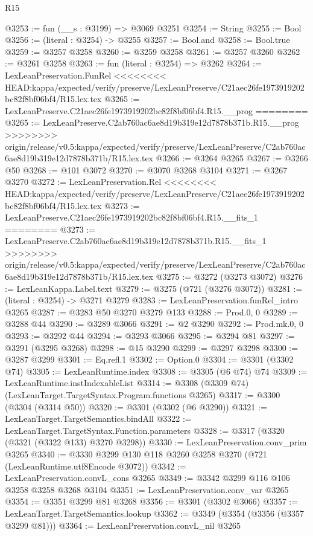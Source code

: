 \begin{lexlean}{R15}
\begin{coremodule}
{{{{{{{{{{{{{{{{{{{{{{{{{{{{{{{{{{{{{{{{{{{{{{{{{{{{{{{{{{{{{{{{{{{{{{@3253 := fun (__s : @3199) => @3069 @3251
@3254 := String
@3255 := Bool
@3256 := (literal : @3254) -> @3255
@3257 := Bool.and
@3258 := Bool.true
@3259 := @3257 @3258
@3260 := @3259 @3258
@3261 := @3257 @3260
@3262 := @3261 @3258
@3263 := fun (literal : @3254) => @3262
@3264 := LexLeanPreservation.FunRel
<<<<<<<< HEAD:kappa/expected/verify/preserve/LexLeanPreserve/C21aec26fe1973919202bc82f8bf06bf4/R15.lex.tex
@3265 := LexLeanPreserve.C21aec26fe1973919202bc82f8bf06bf4.R15.__prog
========
@3265 := LexLeanPreserve.C2ab760ac6ae8d19b319e12d7878b371b.R15.__prog
>>>>>>>> origin/release/v0.5:kappa/expected/verify/preserve/LexLeanPreserve/C2ab760ac6ae8d19b319e12d7878b371b/R15.lex.tex
@3266 := @3264 @3265
@3267 := @3266 @50
@3268 := @101 @3072
@3270 := @3070 @3268 @3104
@3271 := @3267 @3270
@3272 := LexLeanPreservation.Rel
<<<<<<<< HEAD:kappa/expected/verify/preserve/LexLeanPreserve/C21aec26fe1973919202bc82f8bf06bf4/R15.lex.tex
@3273 := LexLeanPreserve.C21aec26fe1973919202bc82f8bf06bf4.R15.__fits_1
========
@3273 := LexLeanPreserve.C2ab760ac6ae8d19b319e12d7878b371b.R15.__fits_1
>>>>>>>> origin/release/v0.5:kappa/expected/verify/preserve/LexLeanPreserve/C2ab760ac6ae8d19b319e12d7878b371b/R15.lex.tex
@3275 := @3272 (@3273 @3072)
@3276 := LexLeanKappa.Label.text
@3279 := @3275 (@721 (@3276 @3072))
@3281 := (literal : @3254) -> @3271 @3279
@3283 := LexLeanPreservation.funRel_intro @3265
@3287 := @3283 @50 @3270 @3279 @133
@3288 := Prod.{0, 0}
@3289 := @3288 @44
@3290 := @3289 @3066
@3291 := @2 @3290
@3292 := Prod.mk.{0, 0}
@3293 := @3292 @44
@3294 := @3293 @3066
@3295 := @3294 @81
@3297 := @3291 (@3295 @3268)
@3298 := @15 @3290
@3299 := @3297 @3298
@3300 := @3287 @3299
@3301 := Eq.refl.{1}
@3302 := Option.{0}
@3304 := @3301 (@3302 @74)
@3305 := LexLeanRuntime.index
@3308 := @3305 (@6 @74) @74
@3309 := LexLeanRuntime.instIndexableList
@3314 := @3308 (@3309 @74) (LexLeanTarget.TargetSyntax.Program.functions @3265)
@3317 := @3300 (@3304 (@3314 @50))
@3320 := @3301 (@3302 (@6 @3290))
@3321 := LexLeanTarget.TargetSemantics.bindAll
@3322 := LexLeanTarget.TargetSyntax.Function.parameters
@3328 := @3317 (@3320 (@3321 (@3322 @133) @3270 @3298))
@3330 := LexLeanPreservation.conv_prim @3265
@3340 := @3330 @3299 @130 @118 @3260 @3258 @3270 (@721 (LexLeanRuntime.utf8Encode @3072))
@3342 := LexLeanPreservation.convL_cons @3265
@3349 := @3342 @3299 @116 @106 @3258 @3258 @3268 @3104
@3351 := LexLeanPreservation.conv_var @3265
@3354 := @3351 @3299 @81 @3268
@3356 := @3301 (@3302 @3066)
@3357 := LexLeanTarget.TargetSemantics.lookup
@3362 := @3349 (@3354 (@3356 (@3357 @3299 @81)))
@3364 := LexLeanPreservation.convL_nil @3265
}}}}}}}}}}}}}}}}}}}}}}}}}}}}}}}}}}}}}}}}}}}}}}}}}}}}}}}}}}}}}}}}}}}}}}
\end{coremodule}
\end{lexlean}
